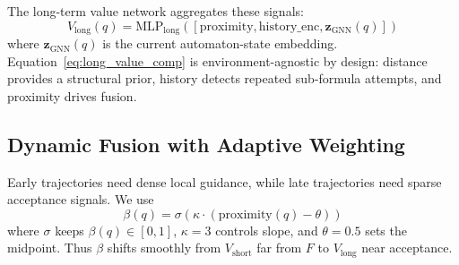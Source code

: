 \documentclass[conference]{IEEEtran}
\begin{document}
The long-term value network aggregates these signals:
\begin{equation}
V_{\text{long}}(q) = \text{MLP}_{\text{long}}([\text{proximity}, \text{history\_enc}, \mathbf{z}_{\text{GNN}}(q)])
\label{eq:long_value_comp}
\end{equation}
where $\mathbf{z}_{\text{GNN}}(q)$ is the current automaton-state embedding. Equation~\ref{eq:long_value_comp} is environment-agnostic by design: distance provides a structural prior, history detects repeated sub-formula attempts, and proximity drives fusion.

\begin{table}[t]
\centering
\caption{Evaluation Configuration Matrix. HV denotes hierarchical value decomposition, MSGNN denotes multi-scale GNN features, Track denotes automaton tracking, and Opt denotes the optional option-level policy module.}
\label{tab:configurations}
\end{table}

\subsection{Dynamic Fusion with Adaptive Weighting}

Early trajectories need dense local guidance, while late trajectories need sparse acceptance signals. We use
\begin{equation}
\beta(q) = \sigma(\kappa \cdot (\text{proximity}(q) - \theta))
\label{eq:beta_definition}
\end{equation}
where $\sigma$ keeps $\beta(q)\in[0,1]$, $\kappa=3$ controls slope, and $\theta=0.5$ sets the midpoint. Thus $\beta$ shifts smoothly from $V_{\text{short}}$ far from $F$ to $V_{\text{long}}$ near acceptance.
\end{document}
